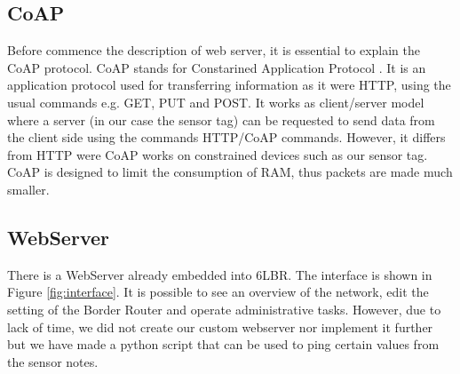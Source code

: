 \subsection{CoAP}
Before commence the description of web server, it is essential to explain the CoAP protocol. CoAP stands for Constarined Application Protocol \cite{coap}. It is an application protocol used for transferring information as it were HTTP, using the usual commands e.g. GET, PUT and POST. It works as client/server model where a server (in our case the sensor tag) can be requested to send data from the client side using the commands HTTP/CoAP commands. However, it differs from HTTP were CoAP works on constrained devices such as our sensor tag. CoAP is designed to limit the consumption of RAM, thus packets are made much smaller.

\subsection{WebServer}
There is a WebServer already embedded into 6LBR. The interface is shown in Figure \ref{fig:interface}. It is possible to see an overview of the network, edit the setting of the Border Router and operate administrative tasks. However, due to lack of time, we did not create our custom webserver nor implement it further but we have made a python script that can be used to ping certain values from the sensor notes.




